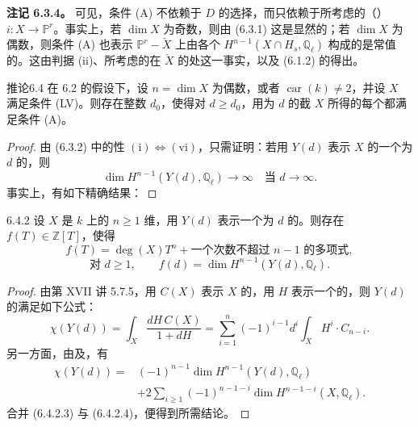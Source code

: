 \textbf{注记 6.3.4。} 可见，条件 (A) 不依赖于 $D$ 的选择，而只依赖于所考虑的（） $i:X\to\mathbb P^r$。事实上，若 $\dim X$ 为奇数，则由 (6.3.1) 这是显然的；若 $\dim X$ 为偶数，则条件 (A) 也表示 $\mathbb P^r-\check X$ 上由各个 $H^{n-1}(X\cap H_s,\mathbb Q_\ell)$ 构成的是常值的。这由判据 (ii)、所考虑的在 $\check X$ 的处这一事实，以及 (6.1.2) 的得出。

\begin{SGAresult}{推论}{6.4}
在 6.2 的假设下，设 $n=\dim X$ 为偶数，或者 $\operatorname{car}(k)\neq2$，并设 $X$ 满足条件 (LV)。则存在整数 $d_0$，使得对 $d\geq d_0$，用为 $d$ 的截 $X$ 所得的每个都满足条件 (A)。
\end{SGAresult}
\begin{proof}
由 (6.3.2) 中的性 $(\mathrm{i})\Longleftrightarrow(\mathrm{vi})$，只需证明：若用 $Y(d)$ 表示 $X$ 的一个为 $d$ 的，则
\[
\dim H^{n-1}(Y(d),\mathbb Q_\ell)\longrightarrow\infty
\quad\text{当 }d\longrightarrow\infty.
\tag{6.4.1}
\]
事实上，有如下精确结果：
\end{proof}

\begin{SGAresult}{}{6.4.2}
设 $X$ 是 $k$ 上的 $n\geq1$ 维，用 $Y(d)$ 表示一个为 $d$ 的。则存在 $f(T)\in\mathbb Z[T]$，使得
\[
f(T)=\deg(X)T^n+\text{一个次数不超过 }n-1\text{ 的多项式},
\tag{6.4.2.1}
\]
\[
\text{对 }d\geq1,\qquad f(d)=\dim H^{n-1}(Y(d),\mathbb Q_\ell).
\tag{6.4.2.2}
\]
\end{SGAresult}
\begin{proof}
由第 XVII 讲 5.7.5，用 $C(X)$ 表示 $X$ 的，用 $H$ 表示一个的，则 $Y(d)$ 的满足如下公式：
\[
\chi(Y(d))=\int_X\frac{dH\,C(X)}{1+dH}
=\sum_{i=1}^{n}(-1)^{i-1}d^i\int_X H^i\cdot C_{n-i}.
\tag{6.4.2.3}
\]
另一方面，由及，有
\[
\begin{split}
\chi(Y(d))={}&(-1)^{n-1}\dim H^{n-1}(Y(d),\mathbb Q_\ell)\\
&+2\sum_{i\geq1}(-1)^{n-1-i}\dim H^{n-1-i}(X,\mathbb Q_\ell).
\end{split}
\tag{6.4.2.4}
\]
合并 (6.4.2.3) 与 (6.4.2.4)，便得到所需结论。
\end{proof}

